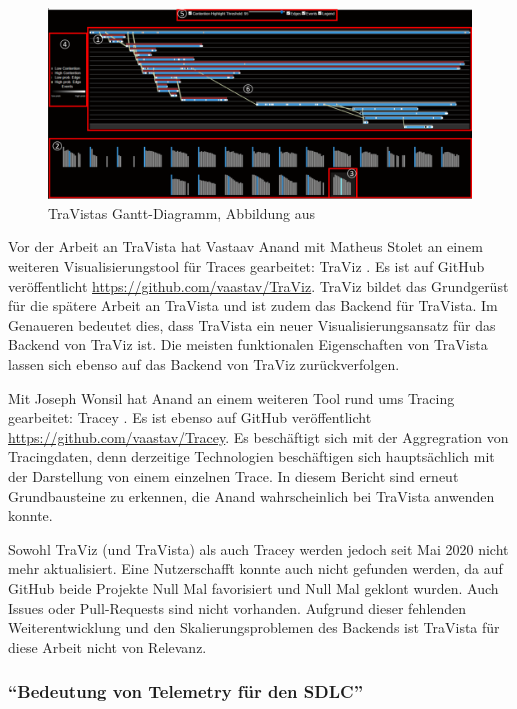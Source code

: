 \begin{figure}[H]
	\centering
	\includegraphics[width=0.815\linewidth]{img/03_methoden/travista_extended-gantt.png}
	\caption{TraVistas Gantt-Diagramm, Abbildung aus \cite{TraVistaPaper}}
	\label{fig:travista_extended-gantt}
\end{figure}

Vor der Arbeit an TraVista hat Vastaav Anand mit Matheus Stolet an einem weiteren Visualisierungstool für Traces gearbeitet: TraViz \cite{TraVizPaper}. Es ist auf GitHub veröffentlicht \url{https://github.com/vaastav/TraViz}. TraViz bildet das Grundgerüst für die spätere Arbeit an TraVista und ist zudem das Backend für TraVista. Im Genaueren bedeutet dies, dass TraVista ein neuer Visualisierungsansatz für das Backend von TraViz ist. Die meisten funktionalen Eigenschaften von TraVista lassen sich ebenso auf das Backend von TraViz zurückverfolgen.

Mit Joseph Wonsil hat Anand an einem weiteren Tool rund ums Tracing gearbeitet: Tracey \cite{TraceyPaper}. Es ist ebenso auf GitHub veröffentlicht \url{https://github.com/vaastav/Tracey}. Es beschäftigt sich mit der Aggregration von Tracingdaten, denn derzeitige Technologien beschäftigen sich hauptsächlich mit der Darstellung von einem einzelnen Trace. In diesem Bericht sind erneut Grundbausteine zu erkennen, die Anand wahrscheinlich bei TraVista anwenden konnte.

Sowohl TraViz (und TraVista) als auch Tracey werden jedoch seit Mai 2020 nicht mehr aktualisiert. Eine Nutzerschafft konnte auch nicht gefunden werden, da auf GitHub beide Projekte Null Mal favorisiert und Null Mal geklont wurden. Auch Issues oder Pull-Requests sind nicht vorhanden. Aufgrund dieser fehlenden Weiterentwicklung und den Skalierungsproblemen des Backends ist TraVista für diese Arbeit nicht von Relevanz. %

\subsubsection{\enquote{Bedeutung von Telemetry für den SDLC}}

